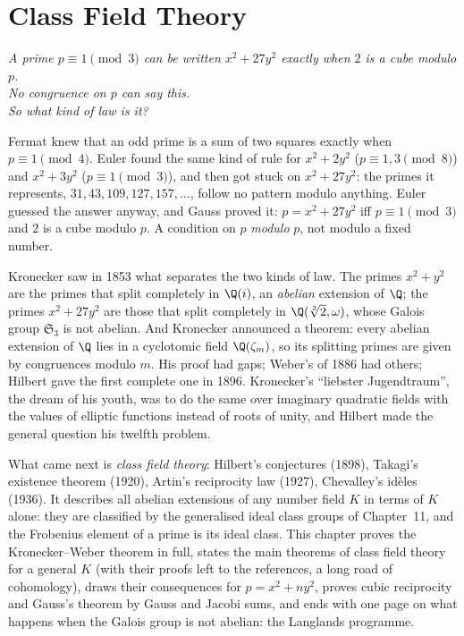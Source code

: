 \chapter{Class Field Theory}
\begin{center}\itshape
A prime $p\equiv1\pmod 3$ can be written $x^2+27y^2$ exactly when $2$ is a cube modulo $p$.\\
No congruence on $p$ can say this.\\
So what kind of law is it?
\end{center}

Fermat knew that an odd prime is a sum of two squares exactly when $p\equiv1\pmod4$. Euler found the same kind of rule for
$x^2+2y^2$ ($p\equiv1,3\pmod8$) and $x^2+3y^2$ ($p\equiv1\pmod3$), and then got stuck on $x^2+27y^2$: the primes it represents,
$31,43,109,127,157,\dots$, follow no pattern modulo anything. Euler guessed the answer anyway, and Gauss proved it: $p=x^2+27y^2$
iff $p\equiv1\pmod3$ and $2$ is a cube modulo $p$. A condition on $p$ \emph{modulo} $p$, not modulo a fixed number.

Kronecker saw in 1853 what separates the two kinds of law. The primes $x^2+y^2$ are the primes that split completely in $\Q(i)$, an
\emph{abelian} extension of $\Q$; the primes $x^2+27y^2$ are those that split completely in $\Q(\sqrt[3]2,\omega)$, whose Galois group
$\mathfrak S_3$ is not abelian. And Kronecker announced a theorem: every abelian extension of $\Q$ lies in a cyclotomic field
$\Q(\zeta_m)$, so its splitting primes are given by congruences modulo $m$. His proof had gaps; Weber's of 1886 had others; Hilbert
gave the first complete one in 1896. Kronecker's ``liebster Jugendtraum'', the dream of his youth, was to do the same over imaginary
quadratic fields with the values of elliptic functions instead of roots of unity, and Hilbert made the general question his
twelfth problem.

What came next is \emph{class field theory}: Hilbert's conjectures (1898), Takagi's existence theorem (1920), Artin's reciprocity law
(1927), Chevalley's id\`eles (1936). It describes all abelian extensions of any number field $K$ in terms of $K$ alone: they are
classified by the generalised ideal class groups of Chapter~11, and the Frobenius element of a prime is its ideal class. This chapter
proves the Kronecker--Weber theorem in full, states the main theorems of class field theory for a general $K$ (with their proofs left
to the references, a long road of cohomology), draws their consequences for $p=x^2+ny^2$, proves cubic reciprocity and Gauss's theorem
by Gauss and Jacobi sums, and ends with one page on what happens when the Galois group is not abelian: the Langlands programme.


